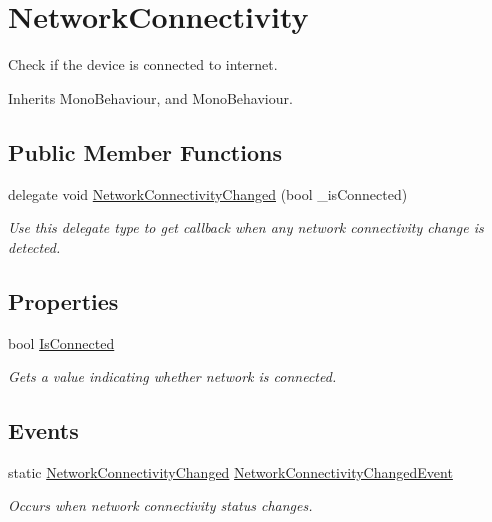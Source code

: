 \hypertarget{class_voxel_busters_1_1_native_plugins_1_1_network_connectivity}{}\section{Network\+Connectivity}
\label{class_voxel_busters_1_1_native_plugins_1_1_network_connectivity}


Check if the device is connected to internet.  




Inherits Mono\+Behaviour, and Mono\+Behaviour.

\subsection*{Public Member Functions}
\begin{DoxyCompactItemize}
\item 
delegate void \hyperlink{class_voxel_busters_1_1_native_plugins_1_1_network_connectivity_a016896a4855f5a0d650366c51144c50a}{Network\+Connectivity\+Changed} (bool \+\_\+is\+Connected)
\begin{DoxyCompactList}\small\item\em Use this delegate type to get callback when any network connectivity change is detected. \end{DoxyCompactList}\end{DoxyCompactItemize}
\subsection*{Properties}
\begin{DoxyCompactItemize}
\item 
bool \hyperlink{class_voxel_busters_1_1_native_plugins_1_1_network_connectivity_abac0113ff571c017320394966a1ae6d5}{Is\+Connected}
\begin{DoxyCompactList}\small\item\em Gets a value indicating whether network is connected. \end{DoxyCompactList}\end{DoxyCompactItemize}
\subsection*{Events}
\begin{DoxyCompactItemize}
\item 
static \hyperlink{class_voxel_busters_1_1_native_plugins_1_1_network_connectivity_a016896a4855f5a0d650366c51144c50a}{Network\+Connectivity\+Changed} \hyperlink{class_voxel_busters_1_1_native_plugins_1_1_network_connectivity_a06cf5d7e4890279aa4a74ba01299e7e5}{Network\+Connectivity\+Changed\+Event}
\begin{DoxyCompactList}\small\item\em Occurs when network connectivity status changes. \end{DoxyCompactList}\end{DoxyCompactItemize}


